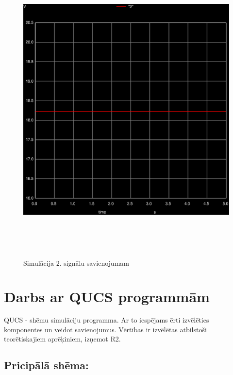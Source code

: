 \documentclass {report}
\begin{document}
\pagebreak

\begin{figure}[!h]
    \centering
        \includegraphics[width=16cm,height=16cm,keepaspectratio]{pictures/012.ps}
    \caption{Simulācija 2. signālu savienojumam}
    \label{fig:3rd}
\end{figure}
\newpage

\section{Darbs ar QUCS programmām}
QUCS - shēmu simulāciju programma. Ar to iespējams ērti izvēlēties komponentes un veidot savienojumus. Vērtības ir izvēlētas atbilstoši teorētiskajiem aprēķiniem, izņemot R2.
\subsection{Pricipālā shēma:}
\pagebreak
\end{document}
